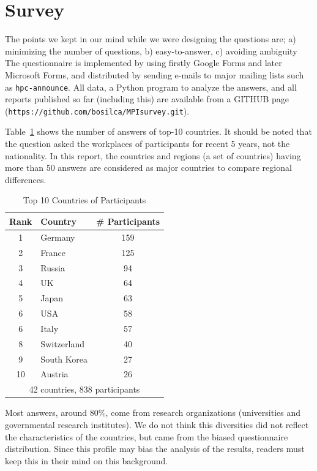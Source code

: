 \documentclass[sigconf,nonacm]{acmart}
\begin{document}
\section{Survey}

The points we kept in our mind while we were designing the
questions are; a) minimizing the number of questions, b) easy-to-answer,
c) avoiding ambiguity
The questionnaire is implemented by using firstly Google Forms and
later Microsoft Forms, and distributed
by sending e-mails to major mailing lists such as {\tt hpc-announce}. 
All data, a Python program to analyze the answers, and all reports
published so far (including this) are available from a GITHUB page
({\tt https://github.com/bosilca/MPIsurvey.git}).  

Table~\ref{tab:countries} shows the number of answers of top-10
countries. It should be noted that the question asked the
workplaces of participants for recent 5 years, not the nationality.
In this report, the countries and regions (a set of countries)
having more than 50 answers are considered as major countries to
compare regional differences.

\begin{table}[htb]%
\begin{center}%
\caption{\small Top 10 Countries of Participants}
\vspace{-3mm}
\label{tab:countries}%
\begin{tabular}{c|l|c}%
\hline%
Rank & Country & \# Participants \\%
\hline%
1 & Germany 	& 159 \\%
2 & France 	& 125 \\%
3 & Russia 	& 94 \\%
4 & UK 		& 64 \\%
5 & Japan 	& 63 \\%
6 & USA 		& 58 \\%
6 & Italy 		& 57 \\%
\hline
8 & Switzerland & 40 \\%
9 & South Korea & 27 \\%
10 & Austria 	& 26  \\%
\hline%
\multicolumn{3}{c}{42 countries, 838 participants} \\%
\end{tabular}%
\end{center}%
\vspace{-8mm}
\end{table}%

Most answers, around 80\%, come from research organizations
(universities and governmental research institutes).  We do not think this
diversities did not reflect the characteristics of the countries, but
came from the biased questionnaire distribution. 
Since this profile may bias the analysis of the results, 
readers must keep this in their mind on this background.
\end{document}
